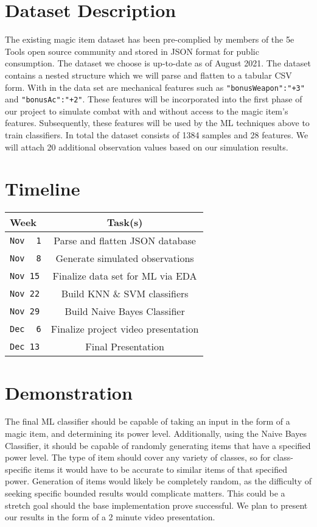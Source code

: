 \documentclass[12pt]{diazessay}
\begin{document}
\section*{Dataset Description}

The existing magic item dataset \cite{Mirror5eTools} has been pre-complied by members of the 5e Tools open source community and stored in JSON format for public consumption.
The dataset we choose is up-to-date as of August 2021.
The dataset contains a nested structure which we will parse and flatten to a tabular CSV form.
With in the data set are mechanical features such as \texttt{"bonusWeapon":"+3"} and \texttt{"bonusAc":"+2"}.
These features will be incorporated into the first phase of our project to simulate combat with and without access to the magic item's features.
Subsequently, these features will be used by the ML techniques above to train classifiers.
In total the dataset consists of 1384 samples and 28 features.
We will attach 20 additional observation values based on our simulation results.


\section*{Timeline}


\begin{tabular}{ |l|c| }
	\hline
	Week & Task(s) \\ \hline
	\texttt{Nov $\,$ 1} & Parse and flatten JSON database  \\
	\texttt{Nov $\,$ 8} & Generate simulated observations  \\
	\texttt{Nov     15} & Finalize data set for ML via EDA \\
	\texttt{Nov     22} & Build KNN \& SVM classifiers \\
	\texttt{Nov     29} & Build Naive Bayes Classifier \\
	\texttt{Dec $\,$ 6} & Finalize project video presentation \\
	\texttt{Dec     13} & Final Presentation \\
	\hline
\end{tabular}


\section*{Demonstration}

The final ML classifier should be capable of taking an input in the form of a magic item, and determining its power level.
Additionally, using the Naive Bayes Classifier, it should be capable of randomly generating items that have a specified power level.
The type of item should cover any variety of classes, so for class-specific items it would have to be accurate to similar items of that specified power.
Generation of items would likely be completely random, as the difficulty of seeking specific bounded results would complicate matters.
This could be a stretch goal should the base implementation prove successful.
We plan to present our results in the form of a 2 minute video presentation.
\end{document}
